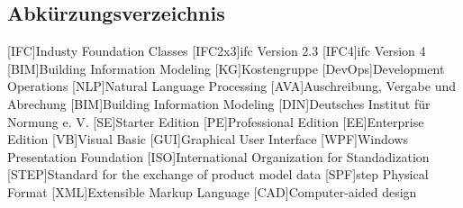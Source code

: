 \begin{acronym}
\section{Abkürzungsverzeichnis}
[IFC]{Industy Foundation Classes}
[IFC2x3]{\ac{ifc} Version 2.3}
[IFC4]{\ac{ifc} Version 4}
[BIM]{Building Information Modeling}
[KG]{Kostengruppe}
[DevOps]{Development Operations}
[NLP]{Natural Language Processing}
[AVA]{Auschreibung, Vergabe und Abrechung}
[BIM]{Building Information Modeling}
[DIN]{Deutsches Institut für Normung e. V.}
[SE]{Starter Edition}
[PE]{Professional Edition}
[EE]{Enterprise Edition}
[VB]{Visual Basic}
[GUI]{Graphical User Interface}
[WPF]{Windows Presentation Foundation}
[ISO]{International Organization for Standadization}
[STEP]{Standard for the exchange of product model data}
[SPF]{\ac{step} Physical Format}
[XML]{Extensible Markup Language}
[CAD]{Computer-aided design}
\end{acronym}